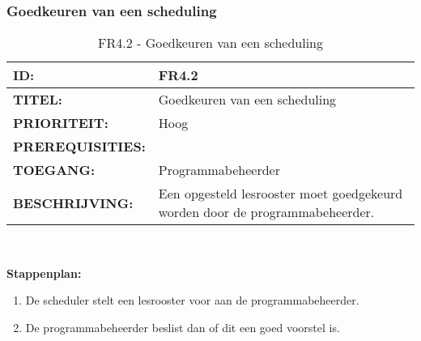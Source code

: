 \subsubsection{Goedkeuren van een scheduling}
\noindent\begin{table}[H]
            \begin{tabular}{l | p{10cm}}
                \textbf{ID:} & FR4.2 \\ \hline
                \textbf{TITEL:} & Goedkeuren van een scheduling\\ \hline
                \textbf{PRIORITEIT:} &  Hoog \\ \hline
                \textbf{PREREQUISITIES:} & \\ \hline
                \textbf{TOEGANG:} & Programmabeheerder \\ \hline
                \textbf{BESCHRIJVING:} & Een opgesteld lesrooster moet goedgekeurd worden door de programmabeheerder.\\
            \end{tabular}\\
            \caption{FR4.2 - Goedkeuren van een scheduling}
            \label{tab:FR4.2 - Goedkeuren van een scheduling}
        \end{table}
      
\textbf{Stappenplan:}
	\begin{enumerate}
	\item De scheduler stelt een lesrooster voor aan de programmabeheerder.
	\item De programmabeheerder beslist dan of dit een goed voorstel is.
	\end{enumerate}

